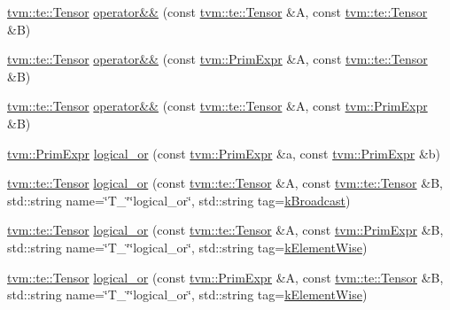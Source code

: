\begin{DoxyCompactItemize}
\item 
\hyperlink{classtvm_1_1te_1_1Tensor}{tvm\+::te\+::\+Tensor} \hyperlink{namespacetopi_aa0ee9998fef4c3e13bce7e73291617e9}{operator\&\&} (const \hyperlink{classtvm_1_1te_1_1Tensor}{tvm\+::te\+::\+Tensor} \&A, const \hyperlink{classtvm_1_1te_1_1Tensor}{tvm\+::te\+::\+Tensor} \&B)
\item 
\hyperlink{classtvm_1_1te_1_1Tensor}{tvm\+::te\+::\+Tensor} \hyperlink{namespacetopi_a8f0608df533871f5ee5d941f74b2d202}{operator\&\&} (const \hyperlink{classtvm_1_1PrimExpr}{tvm\+::\+Prim\+Expr} \&A, const \hyperlink{classtvm_1_1te_1_1Tensor}{tvm\+::te\+::\+Tensor} \&B)
\item 
\hyperlink{classtvm_1_1te_1_1Tensor}{tvm\+::te\+::\+Tensor} \hyperlink{namespacetopi_a1c7800d681e491b45954820baf249ae4}{operator\&\&} (const \hyperlink{classtvm_1_1te_1_1Tensor}{tvm\+::te\+::\+Tensor} \&A, const \hyperlink{classtvm_1_1PrimExpr}{tvm\+::\+Prim\+Expr} \&B)
\item 
\hyperlink{classtvm_1_1PrimExpr}{tvm\+::\+Prim\+Expr} \hyperlink{namespacetopi_ac1866543337af365604bc7215a7cf30b}{logical\+\_\+or} (const \hyperlink{classtvm_1_1PrimExpr}{tvm\+::\+Prim\+Expr} \&a, const \hyperlink{classtvm_1_1PrimExpr}{tvm\+::\+Prim\+Expr} \&b)
\item 
\hyperlink{classtvm_1_1te_1_1Tensor}{tvm\+::te\+::\+Tensor} \hyperlink{namespacetopi_a28985bec49b9d1ba6dee9544d87553a1}{logical\+\_\+or} (const \hyperlink{classtvm_1_1te_1_1Tensor}{tvm\+::te\+::\+Tensor} \&A, const \hyperlink{classtvm_1_1te_1_1Tensor}{tvm\+::te\+::\+Tensor} \&B, std\+::string name=\char`\"{}T\+\_\+\char`\"{}\char`\"{}logical\+\_\+or\char`\"{}, std\+::string tag=\hyperlink{namespacetopi_a794b9155e9ba9d1c9c42a1cff1fb645f}{k\+Broadcast})
\item 
\hyperlink{classtvm_1_1te_1_1Tensor}{tvm\+::te\+::\+Tensor} \hyperlink{namespacetopi_aa9bfdd6e73160efc632abc0a3c17c601}{logical\+\_\+or} (const \hyperlink{classtvm_1_1te_1_1Tensor}{tvm\+::te\+::\+Tensor} \&A, const \hyperlink{classtvm_1_1PrimExpr}{tvm\+::\+Prim\+Expr} \&B, std\+::string name=\char`\"{}T\+\_\+\char`\"{}\char`\"{}logical\+\_\+or\char`\"{}, std\+::string tag=\hyperlink{namespacetopi_ac1b34ed59d38a5f5338bee6b2cad42be}{k\+Element\+Wise})
\item 
\hyperlink{classtvm_1_1te_1_1Tensor}{tvm\+::te\+::\+Tensor} \hyperlink{namespacetopi_a2facc2b601530e674e5dd903ed5dcc83}{logical\+\_\+or} (const \hyperlink{classtvm_1_1PrimExpr}{tvm\+::\+Prim\+Expr} \&A, const \hyperlink{classtvm_1_1te_1_1Tensor}{tvm\+::te\+::\+Tensor} \&B, std\+::string name=\char`\"{}T\+\_\+\char`\"{}\char`\"{}logical\+\_\+or\char`\"{}, std\+::string tag=\hyperlink{namespacetopi_ac1b34ed59d38a5f5338bee6b2cad42be}{k\+Element\+Wise})

\end{DoxyCompactItemize}
